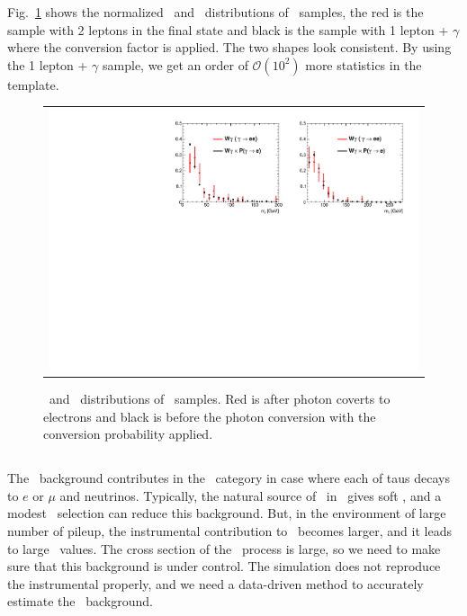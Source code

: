 Fig.~\ref{fig:wgamma_compare} shows the normalized \mll\ and \mt\ distributions 
of \wgamma\ samples, the red is the sample with 2 leptons in the final state 
and black is the sample with 1 lepton + $\gamma$ where the conversion 
factor is applied. The two shapes look consistent. 
By using the 1 lepton + $\gamma$ sample, we get an order of $\mathcal{O}(10^2)$ 
more statistics in the template.  
\begin{figure}[htp] 
\centering 
\begin{tabular}{c} 
\includegraphics[width=1.0\textwidth]{figures/Wgamma_0j_of.pdf} 
\end{tabular} 
\caption{\mll\ and \mt\ distributions of \wgamma\ samples. 
Red is after photon coverts to electrons and black is before the photon conversion 
with the conversion probability applied. }
\label{fig:wgamma_compare} 
\end{figure}  



\subsection{\ztt}

The \ztt\ background contributes in the \DF\ category in case where 
each of taus decays to $e$ or $\mu$ and neutrinos. Typically, the natural source 
of \met\ in \ztt\ gives soft \met, and a modest \met\ selection can  
reduce this background. But, in the environment of large number of pileup, 
the instrumental contribution to \met\ becomes larger, and it leads to large 
\met\ values. The cross section of the \ztt\ process is large, so we need to make 
sure that this background is under control. The simulation does not reproduce 
the instrumental \met properly, and we need a data-driven method to 
accurately estimate the \ztt\ background. 

